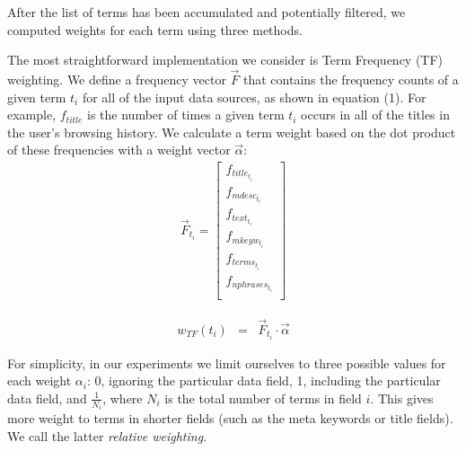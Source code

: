 \documentclass{sig-alternate}
\begin{document}
After the list of terms has been accumulated and potentially filtered, we computed weights for each term using three methods.

\vspace{3mm}

The most straightforward implementation we consider is Term Frequency (TF) weighting. We define a frequency vector \begin{math} \vec{F} \end{math} that contains the frequency counts of a given term \begin{math} t{_{i}} \end{math} for all of the input data sources, as shown in equation (1). For example, \begin{math} f{_{title}} \end{math} is the number of times a given term \begin{math} t{_{i}} \end{math} occurs in all of the titles in the user's browsing history.  We calculate a term weight based on the dot product of these frequencies with a weight vector $\vec{\alpha}$:
\begin{eqnarray}
\vec{F}{_{t_i}} = \left[ \begin{array}{ccc}
f{_{title{_{t_i}}}} \\
f{_{mdesc{_{t_i}}}} \\
f{_{text{_{t_i}}}} \\
f{_{mkeyw{_{t_i}}}} \\
f{_{terms{_{t_i}}}} \\
f{_{nphrases{_{t_i}}}} \\
\end{array} \right]
\end{eqnarray}

\begin{eqnarray}
w{_{TF}}(t{_{i}}) & = & \vec{F}{_{t{_{i}}}} \cdot \vec{\alpha}
\end{eqnarray}

For simplicity, in our experiments we limit ourselves to three possible values for each weight $\alpha_i$: 0, ignoring the particular data field, 1, including the particular data field, and $\frac{1}{N_i}$, where $N_i$ is the total number of terms in field $i$. This gives more weight to terms in shorter fields (such as the meta keywords or title fields). We call the latter \emph{relative weighting}.

\vspace{3mm}
\end{document}
